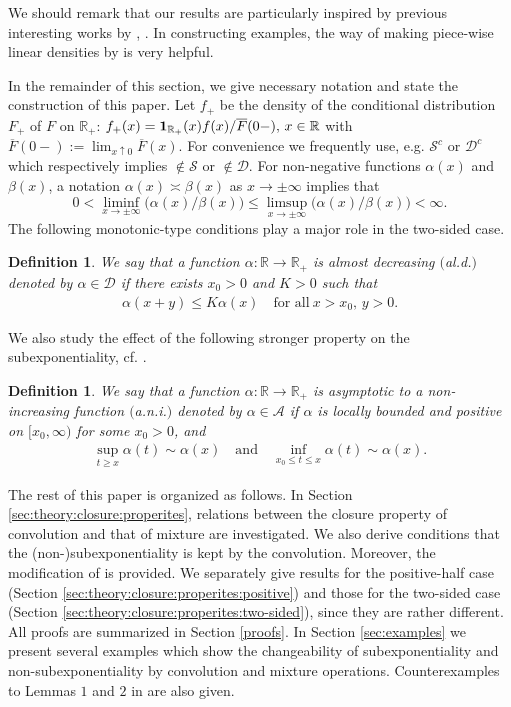 \documentclass[12pt,leqno]{amsart}
\newtheorem{definition}[lemma]{Definition}
\newcommand{\R}{\mathbb{R}}
\newcommand{\ov}{\overline}
\newcommand{\cals}{{\mathcal S}}
\newcommand{\cala}{{\mathcal A}}
\newcommand{\cald}{{\mathcal D}}
\newcommand{\1}{{\mathbf 1}}
\begin{document}
We should remark that our results are particularly inspired by previous interesting works by \cite{Kluppelberg:Villasenor:1991}, 
\cite{Leipus:Siaulys:2020}. In constructing examples, the way of making piece-wise linear densities 
by \cite{Jiang:Wang:Cui:Chen:2019} is very helpful.

In the remainder of this section, we give necessary notation and state the construction of this paper.  
Let $f_+$ be the density of the conditional distribution $F_+$ of $F$ on $\R_+$:
$f_+(x)={\bf 1}_{\R_+}(x) f(x) / \ov F(0-),\,x \in \R$ with $\ov F(0-):=\lim_{x\uparrow 0} \ov F(x)$. 
For convenience we frequently use, e.g. $\cals^c$ or $\cald^c$ which respectively implies $\notin \cals$ or $\notin \cald$. 
For non-negative functions $\alpha(x)$ and $\beta(x)$, a notation $\alpha(x)\asymp \beta(x)$ as $x\to \pm \infty$ implies 
that 
\[
 0<\liminf_{x\to \pm \infty} \big(\alpha(x)/ \beta(x)\big) \le \limsup_{x\to \pm \infty} \big( \alpha(x)/\beta(x) \big) <\infty. 
\]
The following monotonic-type conditions play a major role in the two-sided case. 
\begin{definition}
\label{def:ani}
 We say that a function $\alpha:\R\to \R_+$ is almost decreasing $($al.d.$)$ denoted by 
$\alpha \in \cald$ 
if there exists $x_0>0$ and $K>0$ such that 
\begin{align}
\label{eq:def:ald}
 \alpha(x+y) \le K\alpha(x)\quad \text{for all}\ x>x_0,\,y>0.
\end{align} 
\end{definition}
We also study the effect of the following stronger property on the subexponentiality, cf. \cite[p.23]{Bingham:Goldie:Teugels:1989}. 
\begin{definition}
 We say that a function $\alpha:\R\to \R_+$ is asymptotic to a non-increasing function $($a.n.i.$)$ denoted by 
$\alpha \in \cala$
if  
$\alpha$ is locally bounded and positive on $[x_0,\infty)$ for some $x_0>0$, and 
\begin{align}
\label{eq:def:ani}
 \sup_{t\ge x} \alpha(t)\sim \alpha(x)\quad \text{and}\quad \inf_{x_0\le t \le x} \alpha(t)\sim \alpha(x). 
\end{align}
\end{definition}

The rest of this paper is organized as follows. 
In Section \ref{sec:theory:closure:properites}, 
relations between the closure property of convolution and that of mixture 
are investigated. We also derive conditions that the (non-)subexponentiality is 
kept by the convolution. Moreover, the modification of \cite[Lemma 2]{Kluppelberg:Villasenor:1991} 
is provided. We separately give results for the positive-half case (Section \ref{sec:theory:closure:properites:positive})
and those for the two-sided case (Section \ref{sec:theory:closure:properites:two-sided}), since they are rather different. 
All proofs are summarized in Section \ref{proofs}. In Section \ref{sec:examples}
we present several examples which show the changeability of subexponentiality and non-subexponentiality 
by convolution and mixture operations. Counterexamples to Lemmas $1$ and $2$ in \cite{Kluppelberg:Villasenor:1991} are also given. 
\end{document}
